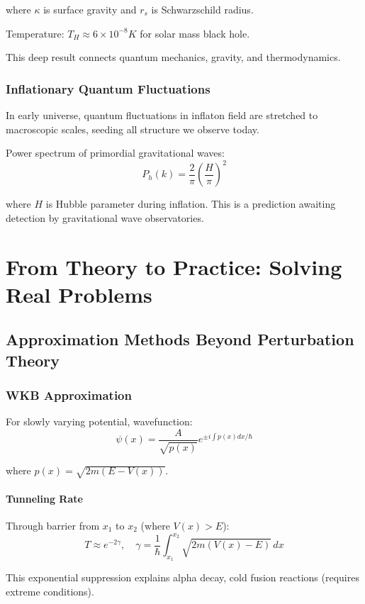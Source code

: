 \documentclass[12pt,openany,oneside]{book}
\begin{document}
{{{where $\kappa$ is surface gravity and $r_s$ is Schwarzschild radius.

Temperature: $T_H \approx 6 \times 10^{-8} K$ for solar mass black hole.

This deep result connects quantum mechanics, gravity, and thermodynamics.

\section{Inflationary Quantum Fluctuations}

In early universe, quantum fluctuations in inflaton field are stretched to macroscopic scales, seeding all structure we observe today.

Power spectrum of primordial gravitational waves:
\[
P_h(k) = \frac{2}{\pi}\left(\frac{H}{\pi}\right)^2
\]

where $H$ is Hubble parameter during inflation. This is a prediction awaiting detection by gravitational wave observatories.

\part{From Theory to Practice: Solving Real Problems}

\chapter{Approximation Methods Beyond Perturbation Theory}

\section{WKB Approximation}

For slowly varying potential, wavefunction:
\[
\psi(x) = \frac{A}{\sqrt{p(x)}}e^{\pm i\int p(x)dx/\hbar}
\]

where $p(x) = \sqrt{2m(E - V(x))}$.

\subsection{Tunneling Rate}

Through barrier from $x_1$ to $x_2$ (where $V(x) > E$):
\[
T \approx e^{-2\gamma}, \quad \gamma = \frac{1}{\hbar}\int_{x_1}^{x_2} \sqrt{2m(V(x) - E)} \, dx
\]

This exponential suppression explains alpha decay, cold fusion reactions (requires extreme conditions).

}}}
\end{document}
